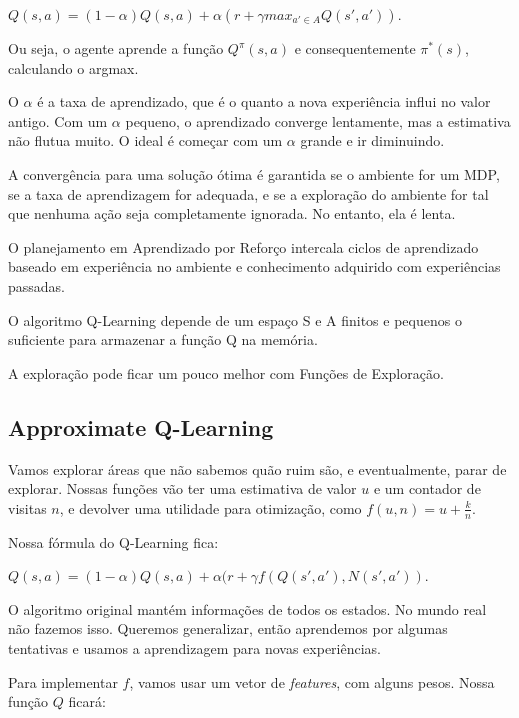 \documentclass[12pt,letterpaper]{article}
\begin{document}
	\begin{center}
		$Q(s,a) = (1-\alpha) Q(s,a)+ \alpha (r + \gamma max_{a' \in A} Q(s', a'))$.
	\end{center}
	
	Ou seja, o agente aprende a função $Q^\pi(s,a)$ e consequentemente $\pi^*(s)$, calculando o argmax.
	
	O $\alpha$ é a taxa de aprendizado, que é o quanto a nova experiência influi no valor antigo. Com um $\alpha$ pequeno, o aprendizado converge lentamente, mas a estimativa não flutua muito. O ideal é começar com um $\alpha$ grande e ir diminuindo.
	
	A convergência para uma solução ótima é garantida se o ambiente for um MDP, se a taxa de aprendizagem for adequada, e se a exploração do ambiente for tal que nenhuma ação seja completamente ignorada. No entanto, ela é lenta.
	
	O planejamento em Aprendizado por Reforço intercala ciclos de aprendizado baseado em experiência no ambiente e conhecimento adquirido com experiências passadas.
	
	O algoritmo Q-Learning depende de um espaço S e A finitos e pequenos o suficiente para armazenar a função Q na memória.
	
	A exploração pode ficar um pouco melhor com Funções de Exploração.
	
	\subsection*{Approximate Q-Learning}
	
	Vamos explorar áreas que não sabemos quão ruim são, e eventualmente, parar de explorar. Nossas funções vão ter uma estimativa de valor $u$ e um contador de visitas $n$, e devolver uma utilidade para otimização, como $f(u, n) = u + \frac{k}{n}$.
	
	Nossa fórmula do Q-Learning fica:
	
		\begin{center}
			$Q(s,a) = (1-\alpha) Q(s,a)+ \alpha (r + \gamma f(Q(s',a'), N(s', a'))$.
		\end{center}
	
	O algoritmo original mantém informações de todos os estados. No mundo real não fazemos isso. Queremos generalizar, então aprendemos por algumas tentativas e usamos a aprendizagem para novas experiências.
	
	Para implementar $f$, vamos usar um vetor de \textit{features}, com alguns pesos. Nossa função $Q$ ficará:
	
\end{document}
